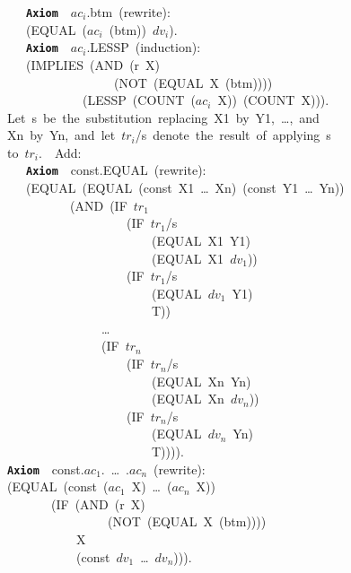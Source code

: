 \documentclass[11pt]{book}
\newenvironment{pubasis}{\begin{flushleft}\ttfamily\small}{\normalsize\rmfamily\end{flushleft}}
\newcommand{\axiomordefinition}[1]{\vspace{6pt}\texttt{\textbf{#1}}}
\begin{document}
\begin{pubasis}
~~~~~~~~~~~\axiomordefinition{Axiom}~~$ac_{i}$.btm~(rewrite):\\
~~~~~~~~~~~(EQUAL~($ac_{i}$~(btm))~$dv_{i}$).\\

~~~~~~~~~~~\axiomordefinition{Axiom}~~$ac_{i}$.LESSP~(induction):\\
~~~~~~~~~~~(IMPLIES~(AND~(r~X)\\
~~~~~~~~~~~~~~~~~~~~~~~~~(NOT~(EQUAL~X~(btm))))\\
~~~~~~~~~~~~~~~~~~~~(LESSP~(COUNT~($ac_{i}$~X))~(COUNT~X))).\\

~~~~~~~~Let~s~be~the~substitution~replacing~X1~by~Y1,~\ldots{},~and\\
~~~~~~~~Xn~by~Yn,~and~let~$tr_{i}$/s~denote~the~result~of~applying~s\\
~~~~~~~~to~$tr_{i}$.~~Add:\\

~~~~~~~~~~~\axiomordefinition{Axiom}~~const.EQUAL~(rewrite):\\
~~~~~~~~~~~(EQUAL~(EQUAL~(const~X1~\ldots{}~Xn)~(const~Y1~\ldots{}~Yn))\\
~~~~~~~~~~~~~~~~~~(AND~(IF~$tr_{1}$\\
~~~~~~~~~~~~~~~~~~~~~~~~~~~(IF~$tr_{1}$/s\\
~~~~~~~~~~~~~~~~~~~~~~~~~~~~~~~(EQUAL~X1~Y1)\\
~~~~~~~~~~~~~~~~~~~~~~~~~~~~~~~(EQUAL~X1~$dv_{1}$))\\
~~~~~~~~~~~~~~~~~~~~~~~~~~~(IF~$tr_{1}$/s\\
~~~~~~~~~~~~~~~~~~~~~~~~~~~~~~~(EQUAL~$dv_{1}$~Y1)\\
~~~~~~~~~~~~~~~~~~~~~~~~~~~~~~~T))\\
~~~~~~~~~~~~~~~~~~~~~~~\ldots{}\\

~~~~~~~~~~~~~~~~~~~~~~~(IF~$tr_{n}$\\
~~~~~~~~~~~~~~~~~~~~~~~~~~~(IF~$tr_{n}$/s\\
~~~~~~~~~~~~~~~~~~~~~~~~~~~~~~~(EQUAL~Xn~Yn)\\
~~~~~~~~~~~~~~~~~~~~~~~~~~~~~~~(EQUAL~Xn~$dv_{n}$))\\
~~~~~~~~~~~~~~~~~~~~~~~~~~~(IF~$tr_{n}$/s\\
~~~~~~~~~~~~~~~~~~~~~~~~~~~~~~~(EQUAL~$dv_{n}$~Yn)\\
~~~~~~~~~~~~~~~~~~~~~~~~~~~~~~~T)))).\\

~~~~~~~~\axiomordefinition{Axiom}~~const.$ac_{1}$.~\ldots{}~.$ac_{n}$~(rewrite):\\
~~~~~~~~(EQUAL~(const~($ac_{1}$~X)~\ldots{}~($ac_{n}$~X))\\
~~~~~~~~~~~~~~~(IF~(AND~(r~X)\\
~~~~~~~~~~~~~~~~~~~~~~~~(NOT~(EQUAL~X~(btm))))\\
~~~~~~~~~~~~~~~~~~~X\\
~~~~~~~~~~~~~~~~~~~(const~$dv_{1}$~\ldots{}~$dv_{n}$))).\\


\end{pubasis}
\end{document}
